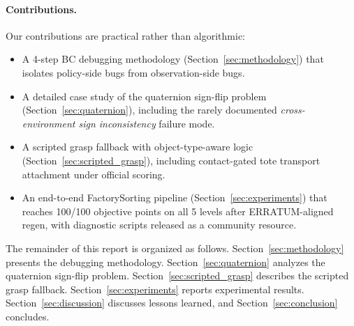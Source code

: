 \paragraph{Contributions.} Our contributions are practical rather than algorithmic:
\begin{itemize}[leftmargin=*,itemsep=2pt]
    \item A 4-step BC debugging methodology (Section~\ref{sec:methodology}) that isolates policy-side bugs from observation-side bugs.
    \item A detailed case study of the quaternion sign-flip problem (Section~\ref{sec:quaternion}), including the rarely documented \emph{cross-environment sign inconsistency} failure mode.
    \item A scripted grasp fallback with object-type-aware logic (Section~\ref{sec:scripted_grasp}), including contact-gated tote transport attachment under official scoring.
    \item An end-to-end FactorySorting pipeline (Section~\ref{sec:experiments}) that reaches 100/100 objective points on all 5 levels after ERRATUM-aligned regen, with diagnostic scripts released as a community resource.
\end{itemize}

The remainder of this report is organized as follows. Section~\ref{sec:methodology} presents the debugging methodology. Section~\ref{sec:quaternion} analyzes the quaternion sign-flip problem. Section~\ref{sec:scripted_grasp} describes the scripted grasp fallback. Section~\ref{sec:experiments} reports experimental results. Section~\ref{sec:discussion} discusses lessons learned, and Section~\ref{sec:conclusion} concludes.
